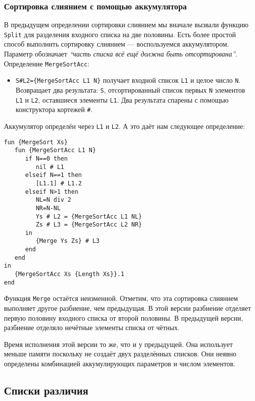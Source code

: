\subsubsection{Сортировка слиянием с помощью аккумулятора}

В предыдущем определении сортировки слиянием мы вначале вызвали функцию \lstinline!Split! для разделения входного списка на две половины. Есть более простой способ выполнить сортировку слиянием --- воспользуемся аккумулятором. Параметр обозначает \emph{``часть списка всё ещё должна быть отсортирована''}. Определение \lstinline!MergeSortAcc!:

\begin{itemize}
\item{\verb|S#L2={MergeSortAcc L1 N}| получает входной список \lstinline!L1! и целое число \lstinline!N!. Возвращает два результата: \lstinline!S!, отсортированный список первых \lstinline!N! элементов \lstinline!L1! и \lstinline!L2!, оставшиеся элементы \lstinline!L1!. Два результата спарены с помощью конструктора кортежей \verb|#|.}
\end{itemize}

Аккумулятор определён через \lstinline!L1! и \lstinline!L2!. А это даёт нам следующее определение:

\begin{lstlisting}
fun {MergeSort Xs}
   fun {MergeSortAcc L1 N}
      if N==0 then
         nil # L1
      elseif N==1 then
         [L1.1] # L1.2
      elseif N>1 then
         NL=N div 2
         NR=N-NL
         Ys # L2 = {MergeSortAcc L1 NL}
         Zs # L3 = {MergeSortAcc L2 NR}
      in
         {Merge Ys Zs} # L3
      end
   end
in
   {MergeSortAcc Xs {Length Xs}}.1
end
\end{lstlisting}

Функция \lstinline!Merge! остаётся неизменной. Отметим, что эта сортировка слиянием выполняет другое разбиение, чем предыдущая. В этой версии разбиение отделяет первую половину входного списка от второй половины. В предыдущей версии, разбиение отделяло нечётные элементы списка от чётных.

Время исполнения этой версии то же, что и у предыдущей. Она использует меньше памяти поскольку не создаёт двух разделённых списков. Они неявно определены комбинацией аккумулирующих параметров и числом элементов.

\subsection{Списки различия}

